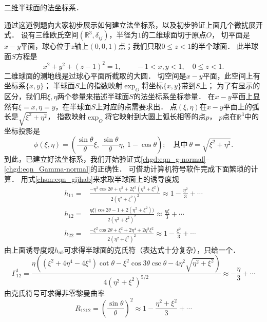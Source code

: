 \begin{example}
    二维半球面的法坐标系．
\end{example}

通过这道例题向大家初步展示如何建立法坐标系，以及初步验证上面几个微扰展开式．
设有三维欧氏空间$(\mathbb{R}^3,\delta_{ij})$，半径为$1$的二维球面切于原点$O$，
切平面是$x-y$平面，球心位于$z$轴上$(0,0,1)$点；我们只取$0\leqslant z <1$的半个球面．
此半球面$S$方程是
\begin{equation}
    x^2+y^2 + (z-1)^2 = 1, \qquad -1<x,y< 1,\quad 0\leqslant z <1 .
\end{equation}
二维球面的测地线是过球心平面所截取的大圆．
切空间是$x-y$平面，此空间上有坐标系$\{x,y\}$；
半球面$S$上的指数映射$\exp_O$将坐标$\{x,y\}$带到$S$上；
为了有显示的区分，我们用$\xi,\eta$两个参量来描述半球面$S$的法坐标系坐标参量．
在$x-y$平面上显然有$\xi=x, \eta=y$，在半球面$S$上对应的点需要求出．
点$(\xi,\eta)$在$x-y$平面上的弧长是$\sqrt{\xi^2 +\eta^2}$，
指数映射$\exp_O$将它映射到大圆上弧长相等的点$p$，
$p$点在$\mathbb{R}^3$中的坐标投影是
\begin{equation}
    \phi(\xi,\eta)=\left(\frac{ \sin \theta}{\theta }\xi,\
      \frac{ \sin \theta}{\theta}\eta,\  1-\cos\theta \right); \quad
      \text{其中}\ \theta = \sqrt{\xi^2 +\eta^2} .
\end{equation}
到此，已建立好法坐标系，我们开始验证式\eqref{chgd:eqn_g-normal}--\eqref{chgd:eqn_Gamma-normal}的正确性．
可借助计算机符号软件完成下面繁琐的计算．
用式\eqref{chsm:eqn_gijhab}来求取半球面上的诱导度规
\begin{align}
     h_{11}=& \frac{- \eta ^2 \cos 2\theta + \eta ^2
         +2 \xi ^2 \left(\eta ^2+\xi ^2\right)}{2 \left(\eta ^2+\xi ^2\right)^2}
         \approx 1-\frac{\eta ^2}{3} +\cdots \\
     h_{12}=& \frac{\eta  \xi  \bigl( \cos 2\theta-1
         +2 (\eta ^2+\xi ^2)\bigr)}{2 \left(\eta ^2+\xi ^2\right)^2}
         \approx\frac{\eta  \xi }{3} +\cdots \\
     h_{22}=& \frac{- \xi ^2 \cos 2\theta + \xi ^2
         +2 \eta ^4+2 \eta ^2 \xi ^2}{2 \left(\eta ^2+\xi ^2\right)^2}
         \approx1-\frac{\xi ^2}{3} +\cdots
\end{align}
由上面诱导度规$h_{ab}$可求得半球面的克氏符（表达式十分复杂），只给一个．
\begin{equation*}
    \Gamma^1_{12}=\frac{\eta  \left(\left( \xi ^2+4 \eta ^4-4 \xi ^4\right)
        \cot\theta -  \xi ^2 \cos3\theta \csc\theta
        -4 \eta ^2 \sqrt{\eta ^2+\xi ^2}\right)}
        {4  \left(\eta ^2+\xi ^2\right)^{5/2}}
       \approx-\frac{\eta}{3}+\cdots
\end{equation*}
由克氏符号可求得非零黎曼曲率 %
\begin{equation}
    R_{1212}=\left(\frac{\sin \theta}{\theta} \right)^2
     \approx 1- \frac{\eta ^2+\xi ^2}{3}  + \cdots
\end{equation}


